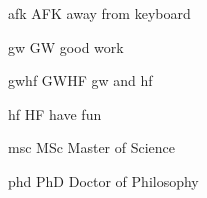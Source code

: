 \newacronym
  {afk}
  {AFK}
  {away from keyboard}

\newacronym
  {gw}
  {GW}
  {good work}

\newacronym
  {gwhf}
  {GWHF}
  {\acrshort{gw} and \acrshort{hf}}

\newacronym
  {hf}
  {HF}
  {have fun}

\newacronym
  {msc}
  {MSc}
  {Master of Science}

\newacronym
  {phd}
  {PhD}
  {Doctor of Philosophy}
